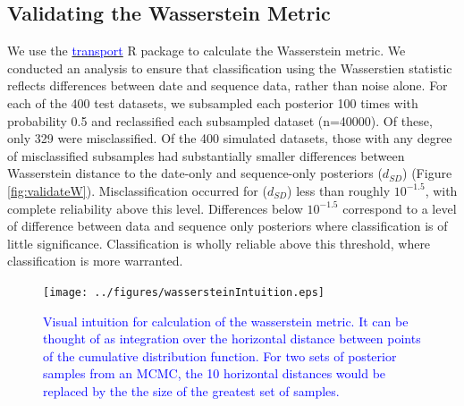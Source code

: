 \documentclass{article}
\begin{document}
\subsection*{Validating the Wasserstein Metric}
We use the \href{https://www.rdocumentation.org/packages/transport/versions/0.12-2/topics/wasserstein1d}{\textcolor{blue}{transport}} R package to calculate the Wasserstein metric. We conducted an analysis to ensure that classification using the Wasserstien statistic reflects differences between date and sequence data, rather than noise alone. For each of the 400 test datasets, we subsampled each posterior 100 times with probability 0.5 and reclassified each subsampled dataset (n=40000). Of these, only 329 were misclassified. Of the 400 simulated datasets, those with any degree of misclassified subsamples had substantially smaller differences between Wasserstein distance to the date-only and sequence-only posteriors ($d_{SD}$) (Figure \ref{fig:validateW}). Misclassification occurred for ($d_{SD}$) less than roughly $10^{-1.5}$, with complete reliability above this level. Differences below $10^{-1.5}$ correspond to a level of difference between data and sequence only posteriors where classification is of little significance. Classification is wholly reliable above this threshold, where classification is more warranted.

\renewcommand{\thefigure}{S\arabic{figure}}
\setcounter{figure}{0}

\begin{figure}[H]
\centering
\texttt{[image: ../figures/wassersteinIntuition.eps]}
\caption{\textcolor{blue}{Visual intuition for calculation of the wasserstein metric. It can be thought of as integration over the horizontal distance between points of the cumulative distribution function. For two sets of posterior samples from an MCMC, the 10 horizontal distances would be replaced by the the size of the greatest set of samples.}}
\label{fig:wassIntuition}
\end{figure}
\end{document}
